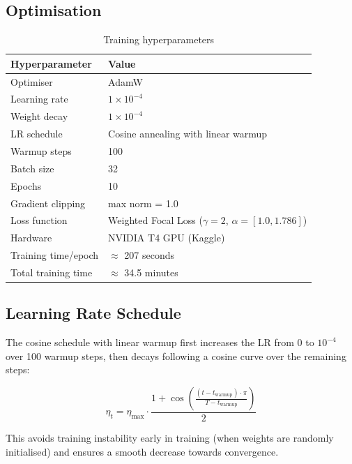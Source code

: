 \documentclass[12pt,a4paper]{article}
\begin{document}
\subsection{Optimisation}

\begin{table}[H]
  \centering
  \caption{Training hyperparameters}
  \renewcommand{\arraystretch}{1.3}
  \begin{tabular}{ll}
    \toprule
    \rowcolor{primaryblue!15}
    \textbf{Hyperparameter} & \textbf{Value} \\
    \midrule
    Optimiser                & AdamW \\
    Learning rate            & $1 \times 10^{-4}$ \\
    Weight decay             & $1 \times 10^{-4}$ \\
    LR schedule              & Cosine annealing with linear warmup \\
    Warmup steps             & 100 \\
    Batch size               & 32 \\
    Epochs                   & 10 \\
    Gradient clipping        & max norm = 1.0 \\
    Loss function            & Weighted Focal Loss ($\gamma = 2$, $\alpha = [1.0, 1.786]$) \\
    \midrule
    Hardware                 & NVIDIA T4 GPU (Kaggle) \\
    Training time/epoch      & $\approx$ 207 seconds \\
    Total training time      & $\approx$ 34.5 minutes \\
    \bottomrule
  \end{tabular}
  \label{tab:hyperparams}
\end{table}

\subsection{Learning Rate Schedule}

The cosine schedule with linear warmup first increases the LR from 0 to $10^{-4}$ over 100 warmup steps, then decays following a cosine curve over the remaining steps:

\[
\eta_t = \eta_{\max} \cdot \frac{1 + \cos\!\left(\frac{(t - t_{\text{warmup}}) \cdot \pi}{T - t_{\text{warmup}}}\right)}{2}
\]

This avoids training instability early in training (when weights are randomly initialised) and ensures a smooth decrease towards convergence.
\end{document}
